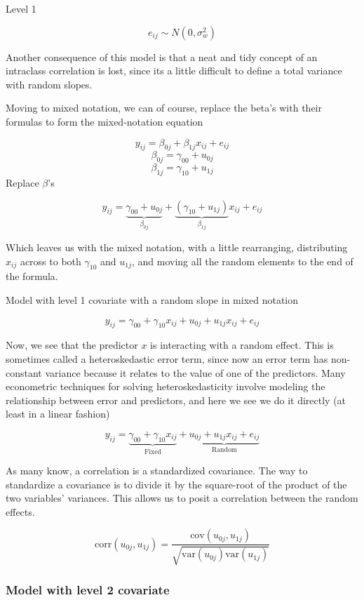 Level 1

\[
e_{ij} \sim N\left(0, \sigma_w^2\right)
\]

Another consequence of this model is that a neat and tidy concept of an intraclass correlation is lost, since its a little difficult to define a total variance with random slopes.

Moving to mixed notation, we can of course, replace the beta's with their formulas to form the mixed-notation equation

\[
y_{ij} = \beta_{0j}+\beta_{1j}x_{ij}+e_{ij}
\]
\[
\beta_{0j} = \gamma_{00}+u_{0j}
\]
\[
\beta_{1j} = \gamma_{10}+u_{1j}
\]
Replace $\beta$'s

\[
y_{ij} = \underbrace{\gamma_{00}+u_{0j}}_{\beta_{0j}}+\underbrace{\left(\gamma_{10}+u_{1j}\right)}_{\beta_{1j}}x_{ij}+e_{ij}
\]

Which leaves us with the mixed notation, with a little rearranging, distributing $x_{ij}$ across to both $\gamma_{10}$ and $u_{1j}$, and moving all the random elements to the end of the formula.

Model with level 1 covariate with a random slope in mixed notation

\[
y_{ij} = \gamma_{00}+\gamma_{10}x_{ij}+u_{0j}+u_{1j}x_{ij}+e_{ij}
\]

Now, we see that the predictor $x$ is interacting with a random effect. This is sometimes called a heteroskedastic error term, since now an error term has non-constant variance because it relates to the value of one of the predictors. Many econometric techniques for solving heteroskedasticity involve modeling the relationship between error and predictors, and here we see we do it directly (at least in a linear fashion)

\[
y_{ij} = \underbrace{\gamma_{00}+\gamma_{10}x_{ij}}_{\text{Fixed}}+\underbrace{u_{0j}+u_{1j}x_{ij}+e_{ij}}_{\text{Random}}
\]


As many know, a correlation is a standardized covariance. The way to standardize a covariance is to divide it by the square-root of the product of the two variables' variances. This allows us to posit a correlation between the random effects.

\[
\mbox{corr}\left(u_{0j},u_{1j}\right) = \frac{\mbox{cov}\left(u_{0j},u_{1j}\right)}{\sqrt{\mbox{var}\left(u_{0j}\right)\mbox{var}\left(u_{1j}\right)}}
\]



\subsubsection{Model with level 2 covariate}

